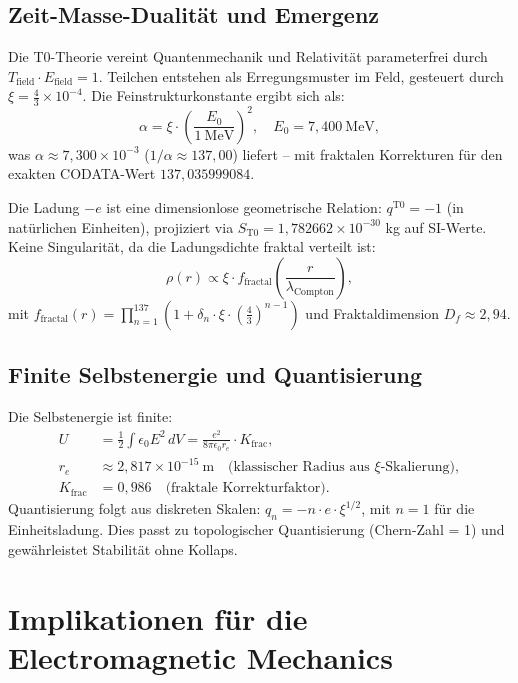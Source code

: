 \documentclass[12pt,a4paper]{article}
\begin{document}
	\subsection{Zeit-Masse-Dualität und Emergenz}
	Die T0-Theorie vereint Quantenmechanik und Relativität parameterfrei durch $T_{\text{field}} \cdot E_{\text{field}} = 1$. Teilchen entstehen als Erregungsmuster im Feld, gesteuert durch $\xi = \frac{4}{3} \times 10^{-4}$. Die Feinstrukturkonstante ergibt sich als:
	\begin{equation}
		\alpha = \xi \cdot \left( \frac{E_0}{1~\mathrm{MeV}} \right)^2, \quad E_0 = 7{,}400~\mathrm{MeV},
	\end{equation}
	was $\alpha \approx 7{,}300 \times 10^{-3}$ ($1/\alpha \approx 137{,}00$) liefert – mit fraktalen Korrekturen für den exakten CODATA-Wert $137{,}035999084$.
	
	Die Ladung $-e$ ist eine dimensionlose geometrische Relation: $q^{\mathrm{T0}} = -1$ (in natürlichen Einheiten), projiziert via $S_{\mathrm{T0}} = 1{,}782662 \times 10^{-30}$ kg auf SI-Werte. Keine Singularität, da die Ladungsdichte fraktal verteilt ist:
	\begin{equation}
		\rho(r) \propto \xi \cdot f_{\text{fractal}}\left( \frac{r}{\lambda_{\text{Compton}}} \right),
	\end{equation}
	mit $f_{\text{fractal}}(r) = \prod_{n=1}^{137} \left(1 + \delta_n \cdot \xi \cdot \left(\frac{4}{3}\right)^{n-1}\right)$ und Fraktaldimension $D_f \approx 2{,}94$.
	
	\subsection{Finite Selbstenergie und Quantisierung}
	Die Selbstenergie ist finite:
	\begin{align}
		U &= \frac{1}{2} \int \epsilon_0 E^2 \, dV = \frac{e^2}{8\pi \epsilon_0 r_e} \cdot K_{\text{frac}}, \\
		r_e &\approx 2{,}817 \times 10^{-15}~\mathrm{m} \quad \text{(klassischer Radius aus $\xi$-Skalierung)}, \\
		K_{\text{frac}} &= 0{,}986 \quad \text{(fraktale Korrekturfaktor)}.
	\end{align}
	Quantisierung folgt aus diskreten Skalen: $q_n = -n \cdot e \cdot \xi^{1/2}$, mit $n=1$ für die Einheitsladung. Dies passt zu topologischer Quantisierung (Chern-Zahl = 1) und gewährleistet Stabilität ohne Kollaps.
	
	\section{Implikationen für die Electromagnetic Mechanics}
	\label{sec:emm}
	
\end{document}
